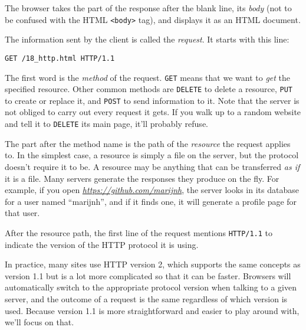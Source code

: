 The browser takes the part of the response after the blank line, its \emph{body} (not to be confused with the HTML \lstinline`<body>` tag), and displays it as an HTML document.

The information sent by the client is called the \emph{request}. It starts with this line:

\begin{lstlisting}
GET /18_http.html HTTP/1.1
\end{lstlisting}
\noindent{}

The first word is the \emph{method} of the request. \lstinline`GET` means that we want to \emph{get} the specified resource. Other common methods are \lstinline`DELETE` to delete a resource, \lstinline`PUT` to create or replace it, and \lstinline`POST` to send information to it. Note that the server is not obliged to carry out every request it gets. If you walk up to a random website and tell it to \lstinline`DELETE` its main page, it'll probably refuse.

The part after the method name is the path of the \emph{resource} the request applies to. In the simplest case, a resource is simply a file on the server, but the protocol doesn't require it to be. A resource may be anything that can be transferred \emph{as if} it is a file. Many servers generate the responses they produce on the fly. For example, if you open \href{https://github.com/marijnh}{\emph{https://github.com\slash marijnh}}, the server looks in its database for a user named ``marijnh'', and if it finds one, it will generate a profile page for that user.

After the resource path, the first line of the request mentions \lstinline`HTTP/1.1` to indicate the version of the HTTP protocol it is using.

In practice, many sites use HTTP version 2, which supports the same concepts as version 1.1 but is a lot more complicated so that it can be faster. Browsers will automatically switch to the appropriate protocol version when talking to a given server, and the outcome of a request is the same regardless of which version is used. Because version 1.1 is more straightforward and easier to play around with, we'll focus on that.

